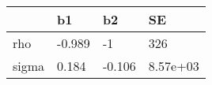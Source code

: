 \begin{tabular}{llll}
\hline 
  & b1 & b2 & SE \\ 
\hline 
rho & -0.989 & -1 & 326 \\ 
sigma & 0.184 & -0.106 & 8.57e+03 \\ 
\hline 
\end{tabular}